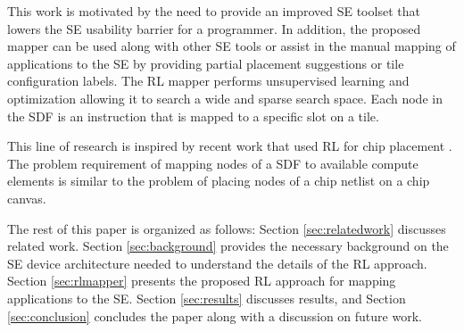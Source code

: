This work is motivated by the need to provide an improved SE toolset that lowers the SE usability barrier for a programmer.
In addition, the proposed mapper can be used along with other SE tools or assist in the manual mapping of applications to the SE by providing partial placement suggestions or tile configuration labels.
The RL mapper performs unsupervised learning and optimization allowing it to search a wide and sparse search space. 
Each node in the SDF is an instruction that is mapped to a specific slot on a tile.

This line of research is inspired by recent work that used RL for chip placement \cite{mirhoseini2020chip}.
The problem requirement of mapping nodes of a SDF to available compute elements is similar to the problem of placing nodes of a chip netlist on a chip canvas. 

The rest of this paper is organized as follows: 
Section \ref{sec:relatedwork} discusses related work.
Section \ref{sec:background} provides the necessary background on the SE device architecture needed to understand the details of the RL approach.
Section \ref{sec:rlmapper} presents the proposed RL approach for mapping applications to the SE.
Section \ref{sec:results} discusses results, and Section \ref{sec:conclusion} concludes the paper along with a discussion on future work.